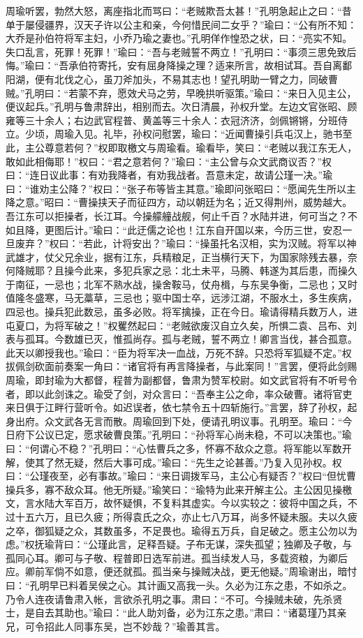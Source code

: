 周瑜听罢，勃然大怒，离座指北而骂曰：“老贼欺吾太甚！”孔明急起止之曰：“昔单于屡侵疆界，汉天子许以公主和亲，今何惜民间二女乎？”瑜曰：“公有所不知：大乔是孙伯符将军主妇，小乔乃瑜之妻也。”孔明佯作惶恐之状，曰：“亮实不知。失口乱言，死罪！死罪！”瑜曰：“吾与老贼誓不两立！”孔明曰：“事须三思免致后悔。”瑜曰：“吾承伯符寄托，安有屈身降操之理？适来所言，故相试耳。吾自离鄱阳湖，便有北伐之心，虽刀斧加头，不易其志也！望孔明助一臂之力，同破曹贼。”孔明曰：“若蒙不弃，愿效犬马之劳，早晚拱听驱策。”瑜曰：“来日入见主公，便议起兵。”孔明与鲁肃辞出，相别而去。次日清晨，孙权升堂。左边文官张昭、顾雍等三十余人；右边武官程普、黄盖等三十余人：衣冠济济，剑佩锵锵，分班侍立。少顷，周瑜入见。礼毕，孙权问慰罢，瑜曰：“近闻曹操引兵屯汉上，驰书至此，主公尊意若何？”权即取檄文与周瑜看。瑜看毕，笑曰：“老贼以我江东无人，敢如此相侮耶！”权曰：“君之意若何？”瑜曰：“主公曾与众文武商议否？”权曰：“连日议此事：有劝我降者，有劝我战者。吾意未定，故请公瑾一决。”瑜曰：“谁劝主公降？”权曰：“张子布等皆主其意。”瑜即问张昭曰：“愿闻先生所以主降之意。”昭曰：“曹操挟天子而征四方，动以朝廷为名；近又得荆州，威势越大。吾江东可以拒操者，长江耳。今操艨艟战舰，何止千百？水陆并进，何可当之？不如且降，更图后计。”瑜曰：“此迂儒之论也！江东自开国以来，今历三世，安忍一旦废弃？”权曰：“若此，计将安出？”瑜曰：“操虽托名汉相，实为汉贼。将军以神武雄才，仗父兄余业，据有江东，兵精粮足，正当横行天下，为国家除残去暴，奈何降贼耶？且操今此来，多犯兵家之忌：北土未平，马腾、韩遂为其后患，而操久于南征，一忌也；北军不熟水战，操舍鞍马，仗舟楫，与东吴争衡，二忌也；又时值隆冬盛寒，马无藁草，三忌也；驱中国士卒，远涉江湖，不服水土，多生疾病，四忌也。操兵犯此数忌，虽多必败。将军擒操，正在今日。瑜请得精兵数万人，进屯夏口，为将军破之！”权矍然起曰：“老贼欲废汉自立久矣，所惧二袁、吕布、刘表与孤耳。今数雄已灭，惟孤尚存。孤与老贼，誓不两立！卿言当伐，甚合孤意。此天以卿授我也。”瑜曰：“臣为将军决一血战，万死不辞。只恐将军狐疑不定。”权拔佩剑砍面前奏案一角曰：“诸官将有再言降操者，与此案同！”言罢，便将此剑赐周瑜，即封瑜为大都督，程普为副都督，鲁肃为赞军校尉。如文武官将有不听号令者，即以此剑诛之。瑜受了剑，对众言曰：“吾奉主公之命，率众破曹。诸将官吏来日俱于江畔行营听令。如迟误者，依七禁令五十四斩施行。”言罢，辞了孙权，起身出府。众文武各无言而散。周瑜回到下处，便请孔明议事。孔明至。瑜曰：“今日府下公议已定，愿求破曹良策。”孔明曰：“孙将军心尚未稳，不可以决策也。”瑜曰：“何谓心不稳？”孔明曰：“心怯曹兵之多，怀寡不敌众之意。将军能以军数开解，使其了然无疑，然后大事可成。”瑜曰：“先生之论甚善。”乃复入见孙权。权曰：“公瑾夜至，必有事故。”瑜曰：“来日调拨军马，主公心有疑否？”权曰“但忧曹操兵多，寡不敌众耳。他无所疑。”瑜笑曰：“瑜特为此来开解主公。主公因见操檄文，言水陆大军百万，故怀疑惧，不复料其虚实。今以实较之：彼将中国之兵，不过十五六万，且已久疲；所得袁氏之众，亦止七八万耳，尚多怀疑未服。夫以久疲之卒，御狐疑之众，其数虽多，不足畏也。瑜得五万兵，自足破之。愿主公勿以为虑。”权抚瑜背曰：“公瑾此言，足释吾疑。子布无谋，深失孤望；独卿及子敬，与孤同心耳。卿可与子敬、程普即日选军前进。孤当续发人马，多载资粮，为卿后应。卿前军倘不如意，便还就孤。孤当亲与操贼决战，更无他疑。”周瑜谢出，暗忖曰：“孔明早已料着吴侯之心。其计画又高我一头。久必为江东之患，不如杀之。乃令人连夜请鲁肃入帐，言欲杀孔明之事。肃曰：“不可。今操贼未破，先杀贤士，是自去其助也。”瑜曰：“此人助刘备，必为江东之患。”肃曰：“诸葛瑾乃其亲兄，可令招此人同事东吴，岂不妙哉？”瑜善其言。

